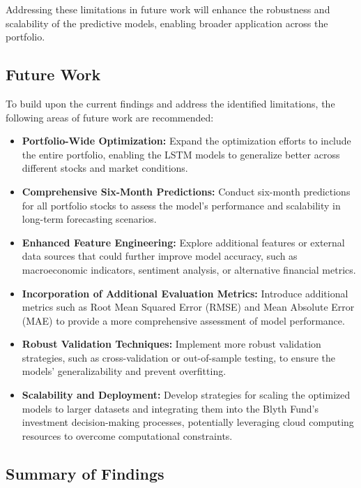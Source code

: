 \documentclass[10pt,twocolumn]{article}
\begin{document}
Addressing these limitations in future work will enhance the robustness and scalability of the predictive models, enabling broader application across the portfolio.

\subsection{Future Work}

To build upon the current findings and address the identified limitations, the following areas of future work are recommended:

\begin{itemize}
    \item \textbf{Portfolio-Wide Optimization:} Expand the optimization efforts to include the entire portfolio, enabling the LSTM models to generalize better across different stocks and market conditions.
    
    \item \textbf{Comprehensive Six-Month Predictions:} Conduct six-month predictions for all portfolio stocks to assess the model's performance and scalability in long-term forecasting scenarios.
    
    \item \textbf{Enhanced Feature Engineering:} Explore additional features or external data sources that could further improve model accuracy, such as macroeconomic indicators, sentiment analysis, or alternative financial metrics.
    
    \item \textbf{Incorporation of Additional Evaluation Metrics:} Introduce additional metrics such as Root Mean Squared Error (RMSE) and Mean Absolute Error (MAE) to provide a more comprehensive assessment of model performance.
    
    \item \textbf{Robust Validation Techniques:} Implement more robust validation strategies, such as cross-validation or out-of-sample testing, to ensure the models' generalizability and prevent overfitting.
    
    \item \textbf{Scalability and Deployment:} Develop strategies for scaling the optimized models to larger datasets and integrating them into the Blyth Fund’s investment decision-making processes, potentially leveraging cloud computing resources to overcome computational constraints.
\end{itemize}

\subsection{Summary of Findings}
\end{document}
